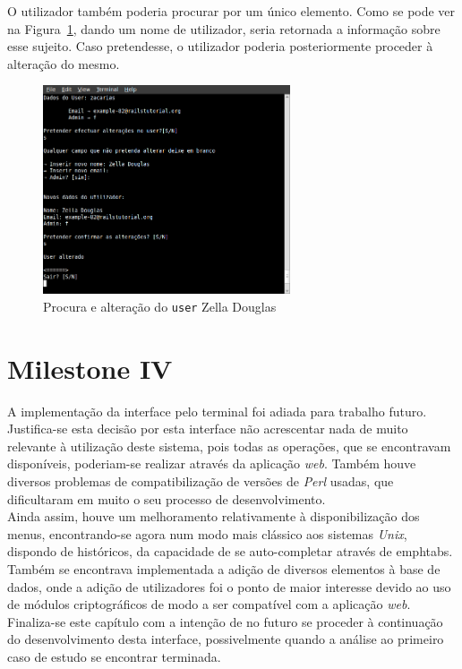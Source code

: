 O utilizador também poderia procurar por um único elemento. Como se pode ver na Figura~\ref{img:zelladouglas}, dando um nome de utilizador, 
seria retornada a informação sobre esse sujeito. Caso pretendesse, o utilizador poderia posteriormente proceder à alteração do mesmo.\\

\begin{figure}[H]
\begin{center}
\includegraphics[width=0.65\textwidth]{Images/zacarias}
\caption{Procura e alteração do \texttt{user} Zella Douglas}\label{img:zelladouglas}
\end{center}
\end{figure} 

\section{Milestone IV}

A implementação da interface pelo terminal foi adiada para trabalho futuro. Justifica-se esta decisão por esta interface não acrescentar nada de muito relevante à utilização deste sistema, pois todas as operações, que se encontravam disponíveis, poderiam-se realizar através da aplicação \emph{web}. Também houve diversos problemas de compatibilização de versões de \emph{Perl} usadas, que dificultaram em muito o seu processo de desenvolvimento.\\

Ainda assim, houve um melhoramento relativamente à disponibilização dos menus, encontrando-se agora num modo mais clássico aos sistemas \emph{Unix}, dispondo de históricos, da capacidade de se auto-completar através de emph{tabs}. Também se encontrava implementada a adição de diversos elementos à base de dados, onde a adição de utilizadores foi o ponto de maior interesse devido ao uso de módulos criptográficos de modo a ser compatível com a aplicação \emph{web}.\\

Finaliza-se este capítulo com a intenção de no futuro se proceder à continuação do desenvolvimento desta interface, possivelmente quando a análise ao primeiro caso de estudo se encontrar terminada.\\
